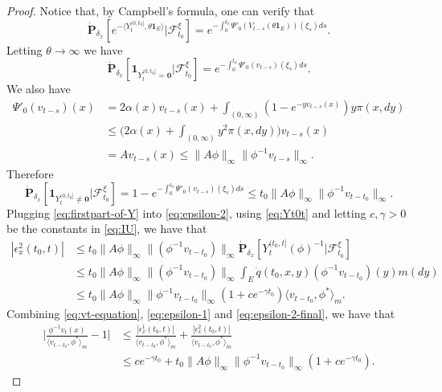 \begin{proof}
	Notice that, by Campbell's formula, one can verify that
\[
	\dot{\mathbf P}_{\delta_x}[e^{-\langle Y_t^{(0,t_0]},\theta \mathbf 1_E\rangle}|\mathscr F^\xi_{t_0}]
	= e^{-\int_0^{t_0}\Psi'_0(V_{t-s}(\theta\mathbf 1_E))(\xi_s)ds}.
\]
	Letting $\theta \to \infty$ we have
\[
	\dot {\mathbf P}_{\delta_x} [ \mathbf 1_{Y_t^{(0,t_0]}=\mathbf 0} | \mathscr F^\xi_{t_0}]
	= e^{-\int_0^{t_0}\Psi'_0(v_{t-s})(\xi_s)ds}.
\]
	We also have
\[\begin{split}
	\Psi'_0(v_{t-s})(x)
	&= 2\alpha(x)v_{t-s}(x) +\int_{(0,\infty)} (1-e^{-yv_{t-s}(x)})y\pi(x,dy)\\
	&\leq \big( 2\alpha (x)+\int_{(0,\infty)}y^2\pi(x,dy) \big) v_{t-s}(x)\\
	&= A v_{t-s}(x) \leq \| A\phi\|_\infty \|\phi^{-1}v_{t-s}\|_\infty.
\end{split}\]
	Therefore
\begin{equation}\label{eq:firstpart-of-Y}
	\dot{\mathbf P}_{\delta_x}[\mathbf 1_{Y_t^{(0,t_0]}\neq \mathbf 0}|\mathscr F^\xi_{t_0}]
	= 1-e^{-\int_0^{t_0}\Psi'_0(v_{t-s})(\xi_s)ds}
	\leq t_0\| A\phi\|_\infty \|\phi^{-1}v_{t-t_0}\|_\infty.
\end{equation}
	Plugging \eqref{eq:firstpart-of-Y} into \eqref{eq:epsilon-2}, using \eqref{eq:Yt0t} and letting $c,\gamma > 0$ be the constants in \eqref{eq:IU}, we have that
\begin{equation}\label{eq:epsilon-2-final}\begin{split}
	|\epsilon_x^2(t_0,t)|
	& \leq t_0\| A\phi\|_\infty \|(\phi^{-1}v_{t-t_0})\|_\infty \dot{\mathbf P}_{\delta_x}[ Y^{(t_0,t]}_t(\phi)^{-1}|\mathscr F^\xi_{t_0}] \\
	& \leq t_0\|  A \phi\|_\infty\|(\phi^{-1}v_{t-t_0}) \|_\infty \int_{E} \dot{q} (t_0,x,y)(\phi^{-1}v_{t-t_0})(y) m(dy)\\
	& \leq t_0\| A\phi\|_\infty \| \phi^{-1}v_{t-t_0}\|_\infty (1+ce^{-\gamma t_0}) \langle v_{t-t_0},\phi^* \rangle_m.
\end{split}\end{equation}
	Combining \eqref{eq:vt-equation}, \eqref{eq:epsilon-1} and \eqref{eq:epsilon-2-final}, we have that
\begin{equation}\label{vts-inequality}\begin{split}
	\Big|\frac{\phi^{-1}v_t(x)}{\langle v_{t-t_0},\phi^* \rangle_m}-1 \Big|
	&\leq \frac{|\epsilon_x^1(t_0,t)|}{\langle v_{t-t_0},\phi^* \rangle_m} + \frac{|\epsilon_x^2(t_0,t)|}{\langle v_{t-t_0},\phi^* \rangle_m}\\
	&\leq ce^{-\gamma t_0} +t_0\| A\phi\|_\infty \| \phi^{-1}v_{t-t_0}\|_\infty (1+ce^{-\gamma t_0}).

\end{split}
\end{equation}
\end{proof}
